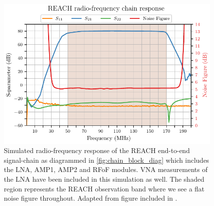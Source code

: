 \begin{figure}
    \centering
    \includegraphics{chain_sim}
    \caption{Simulated radio-frequency response of the REACH end-to-end signal-chain as diagrammed in \cref{fig:chain_block_diag} which includes the LNA, AMP1, AMP2 and RFoF modules. VNA measurements of the LNA have been included in this simulation as well. The shaded region represents the REACH observation band where we see a flat noise figure throughout. Adapted from figure included in \citet{reach}.}
    \label{fig:chain_sim}
\end{figure}


